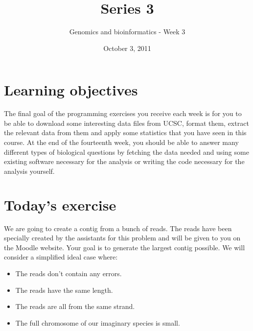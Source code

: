 \documentclass[a4paper,11pt]{article}
\title{Series 3}
\date{October 3, 2011}
\author{Genomics and bioinformatics - Week 3}
\begin{document}
\maketitle

\section{Learning objectives}
The final goal of the programming exercises you receive each week is for you to be able to download some interesting data files from UCSC, format them, extract the relevant data from them and apply some statistics that you have seen in this course. At the end of the fourteenth week, you should be able to answer many different types of biological questions by fetching the data needed and using some existing software necessary for the analysis or writing the code necessary for the analysis yourself.

\section{Today's exercise}
We are going to create a contig from a bunch of reads. The reads have been specially created by the assistants for this problem and will be given to you on the Moodle website. Your goal is to generate the largest contig possible. We will consider a simplified ideal case where:
\begin{itemize}
\item The reads don't contain any errors.
\item The reads have the same length.
\item The reads are all from the same strand.
\item The full chromosome of our imaginary species is small.
\end{itemize}
\end{document}
